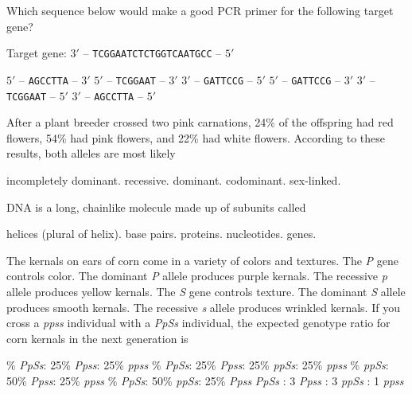 \question
Which sequence below would make a good PCR primer for the following target gene?

\vspace{0.4\baselineskip}
Target gene: $3'$ -- \texttt{TCGGAATCTCTGGTCAATGCC} -- $5'$

\begin{choices}
\correctchoice $5'$ -- \texttt{AGCCTTA} -- $3'$
\choice $5'$ -- \texttt{TCGGAAT} -- $3'$
\choice $3'$ -- \texttt{GATTCCG} -- $5'$
\choice $5'$ -- \texttt{GATTCCG} -- $3'$
\choice $3'$ -- \texttt{TCGGAAT} -- $5'$
\choice $3'$ -- \texttt{AGCCTTA} -- $5'$
\end{choices}

\question
After a plant breeder crossed two pink carnations, 24\% of the offspring had red flowers, 54\% had pink flowers, and 22\% had white flowers. According to these results, both alleles are most likely

\begin{choices}
\correctchoice incompletely dominant.
\choice recessive.
\choice dominant.
\choice codominant.
\choice sex-linked.
\end{choices}

\newpage

\question
DNA is a long, chainlike molecule made up of subunits called

\begin{choices}
\choice helices (plural of helix).
\choice base pairs.
\choice proteins.
\correctchoice nucleotides.
\choice genes.
\end{choices}

\question
The kernals on ears of corn come in a variety of colors and textures. The \textit{P} gene controls color.  The dominant \textit{P} allele produces purple kernals. The recessive \textit{p} allele produces yellow kernals.  The \textit{S} gene controls texture. The dominant \textit{S} allele produces smooth kernals. The recessive \textit{s} allele produces wrinkled kernals. If you cross a \textit{ppss} individual with a \textit{PpSs} individual, the expected genotype ratio for corn kernals in the next generation is 

\begin{choices}
\% \textit{PpSs}: 25\% \textit{Ppss}: 25\% \textit{ppss}
\% \textit{PpSs}: 25\% \textit{Ppss}: 25\% \textit{ppSs}: 25\% \textit{ppss}
\% \textit{ppSs}: 50\% \textit{Ppss}: 25\% \textit{ppss}
\% \textit{PpSs}: 50\% \textit{ppSs}: 25\% \textit{Ppss}
 \textit{PpSs} : 3 \textit{Ppss} : 3 \textit{ppSs} : 1 \textit{ppss}
\end{choices}
